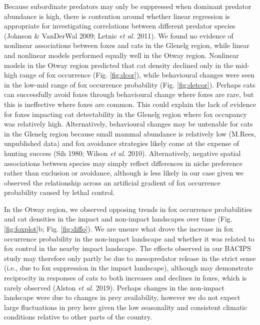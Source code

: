 \documentclass[preprint, 3p, authoryear]{elsarticle} %
\begin{document}
Because subordinate predators may only be suppressed when dominant predator abundance is high, there is contention around whether linear regression is appropriate for investigating correlations between different predator species (Johnson \& VanDerWal 2009; Letnic \emph{et al.} 2011). We found no evidence of nonlinear associations between foxes and cats in the Glenelg region, while linear and nonlinear models performed equally well in the Otway region. Nonlinear models in the Otway region predicted that cat density declined only in the mid-high range of fox occurrence (Fig. \ref{fig:dcor}), while behavioural changes were seen in the low-mid range of fox occurrence probability (Fig. \ref{fig:detcor}). Perhaps cats can successfully avoid foxes through behavioural change where foxes are rare, but this is ineffective where foxes are common. This could explain the lack of evidence for foxes impacting cat detectability in the Glenelg region where fox occupancy was relatively high. Alternatively, behavioural changes may be untenable for cats in the Glenelg region because small mammal abundance is relatively low (M.Rees, unpublished data) and fox avoidance strategies likely come at the expense of hunting success (Sih 1980; Wilson \emph{et al.} 2010). Alternatively, negative spatial associations between species may simply reflect differences in niche preference rather than exclusion or avoidance, although is less likely in our case given we observed the relationship across an artificial gradient of fox occurrence probability caused by lethal control.

In the Otway region, we observed opposing trends in fox occurrence probabilities and cat densities in the impact and non-impact landscapes over time (Fig. \ref{fig:foxplot}b; Fig. \ref{fig:diffo}). We are unsure what drove the increase in fox occurrence probability in the non-impact landscape and whether it was related to fox control in the nearby impact landscape. The effects observed in our BACIPS study may therefore only partly be due to mesopredator release in the strict sense (i.e., due to fox suppression in the impact landscape), although may demonstrate reciprocity in responses of cats to both increases and declines in foxes, which is rarely observed (Alston \emph{et al.} 2019). Perhaps changes in the non-impact landscape were due to changes in prey availability, however we do not expect large fluctuations in prey here given the low seasonality and consistent climatic conditions relative to other parts of the country.
\end{document}
